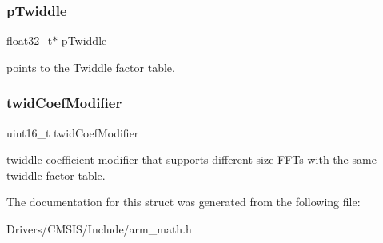 \subsubsection{\texorpdfstring{p\+Twiddle}{pTwiddle}}
{\footnotesize\ttfamily float32\+\_\+t$\ast$ p\+Twiddle}

points to the Twiddle factor table. \mbox{\label{structarm__cfft__radix4__instance__f32_afe772e5b5001c9d8e85032115a8df5bf}} 
\subsubsection{\texorpdfstring{twid\+Coef\+Modifier}{twidCoefModifier}}
{\footnotesize\ttfamily uint16\+\_\+t twid\+Coef\+Modifier}

twiddle coefficient modifier that supports different size F\+F\+Ts with the same twiddle factor table. 

The documentation for this struct was generated from the following file\+:\begin{DoxyCompactItemize}
\item 
Drivers/\+C\+M\+S\+I\+S/\+Include/arm\+\_\+math.\+h\end{DoxyCompactItemize}
